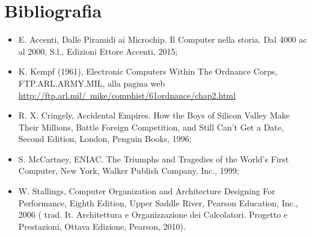 \newpage
\section*{Bibliografia}
	\begin{itemize}
		\item
		E. Accenti, Dalle Piramidi ai Microchip. Il Computer nella storia. Dal 4000 ac al 2000, S.l., Edizioni Ettore Accenti, 2015;
		\item 
		K. Kempf (1961), Electronic Computers Within The Ordnance Corps, FTP.ARL.ARMY.MIL, alla pagina web  \href{http://ftp.arl.mil/~mike/comphist/61ordnance/chap2.html}{\underline{http://ftp.arl.mil/~mike/comphist/61ordnance/chap2.html}}
		\item 
		R. X. Cringely, Accidental Empires. How the Boys of Silicon Valley Make Their Millions, Battle Foreign Competition, and Still Can't Get a Date, Second Edition, London, Penguin Books, 1996;
		\item 
		S. McCartney, ENIAC. The Triumphs and Tragedies of the World's First Computer, New York, Walker Publish Company, Inc., 1999;
		\item
		W. Stallings, Computer Organization and Architecture Designing For Performance, Eighth Edition, Upper Saddle River, Pearson Education, Inc., 2006 ( trad. It. Architettura e Organizzazione dei Calcolatori. Progetto e Prestazioni, Ottava Edizione, Pearson, 2010).
	\end{itemize}

